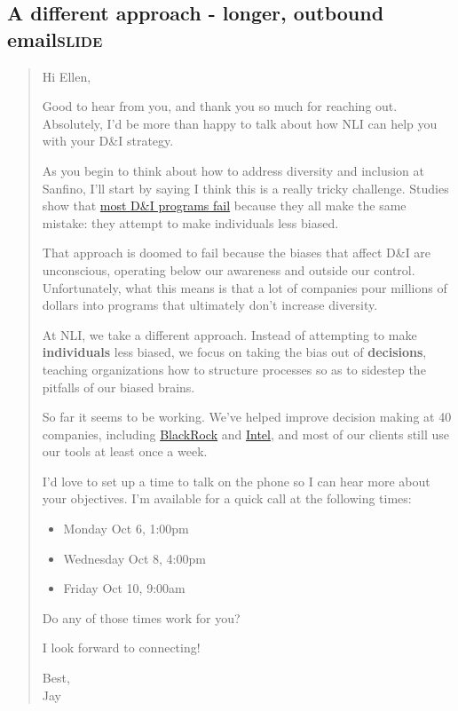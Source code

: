 \documentclass[11pt]{article}
\begin{document}
\subsection{A different approach - longer, outbound email\hfill{}\textsc{slide}}
\label{sec:org6f67a64}
\begin{quote}
Hi Ellen,

Good to hear from you, and thank you so much for reaching out. Absolutely, I'd be more than happy to talk about how NLI can help you with your D\&I strategy.

As you begin to think about how to address diversity and inclusion at Sanfino, I'll start by saying I think this is a really tricky challenge. Studies show that \href{https://hbr.org/2016/07/why-diversity-programs-fail}{most D\&I programs fail} because they all make the same mistake: they attempt to make individuals less biased.

That approach is doomed to fail because the biases that affect D\&I are unconscious, operating below our awareness and outside our control. Unfortunately, what this means is that a lot of companies pour millions of dollars into programs that ultimately don't increase diversity.

At NLI, we take a different approach. Instead of attempting to make \textbf{individuals} less biased, we focus on taking the bias out of \textbf{decisions}, teaching organizations how to structure processes so as to sidestep the pitfalls of our biased brains.

So far it seems to be working. We've helped improve decision making at 40 companies, including \href{https://neuroleadership.com/portfolio-items/case-study-blackrock-breaking-bias/}{BlackRock} and \href{https://neuroleadership.com/portfolio-items/nli-transforms-intel-culture/}{Intel}, and most of our clients still use our tools at least once a week.

I'd love to set up a time to talk on the phone so I can hear more about your objectives. I'm available for a quick call at the following times:

\begin{itemize}
\item Monday Oct 6, 1:00pm
\item Wednesday Oct 8, 4:00pm
\item Friday Oct 10, 9:00am
\end{itemize}

Do any of those times work for you?

I look forward to connecting!

Best, \\
Jay
\end{quote}
\end{document}

